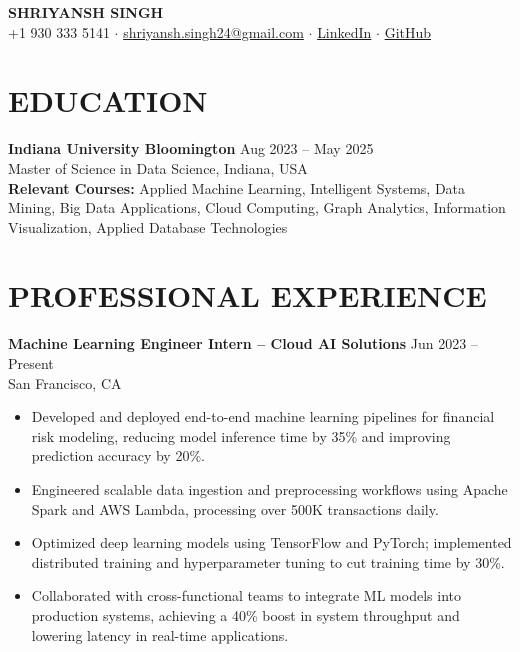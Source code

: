 \documentclass[12pt,a4paper]{article}
\begin{document}
\begin{center}
  {\Large \textbf{SHRIYANSH SINGH}}\\[0.5em]
  +1 930 333 5141 $\cdot$ \href{mailto:shriyansh.singh24@gmail.com}{shriyansh.singh24@gmail.com} $\cdot$ 
  \href{https://www.linkedin.com/in/shriyansh-bir-singh}{LinkedIn} $\cdot$ 
  \href{https://github.com/shriyansh24}{GitHub}\\[0.5em]
\end{center}

\section*{EDUCATION}
\textbf{Indiana University Bloomington} \hfill Aug 2023 -- May 2025\\
Master of Science in Data Science, Indiana, USA\\[0.3em]
\textbf{Relevant Courses:} Applied Machine Learning, Intelligent Systems, Data Mining, Big Data Applications, Cloud Computing, Graph Analytics, Information Visualization, Applied Database Technologies

\section*{PROFESSIONAL EXPERIENCE}

\textbf{Machine Learning Engineer Intern -- Cloud AI Solutions} \hfill Jun 2023 -- Present\\
San Francisco, CA
\begin{itemize}[leftmargin=*,noitemsep,topsep=0pt]
  \item Developed and deployed end-to-end machine learning pipelines for financial risk modeling, reducing model inference time by 35\% and improving prediction accuracy by 20\%.
  \item Engineered scalable data ingestion and preprocessing workflows using Apache Spark and AWS Lambda, processing over 500K transactions daily.
  \item Optimized deep learning models using TensorFlow and PyTorch; implemented distributed training and hyperparameter tuning to cut training time by 30\%.
  \item Collaborated with cross-functional teams to integrate ML models into production systems, achieving a 40\% boost in system throughput and lowering latency in real-time applications.
\end{itemize}
\end{document}
